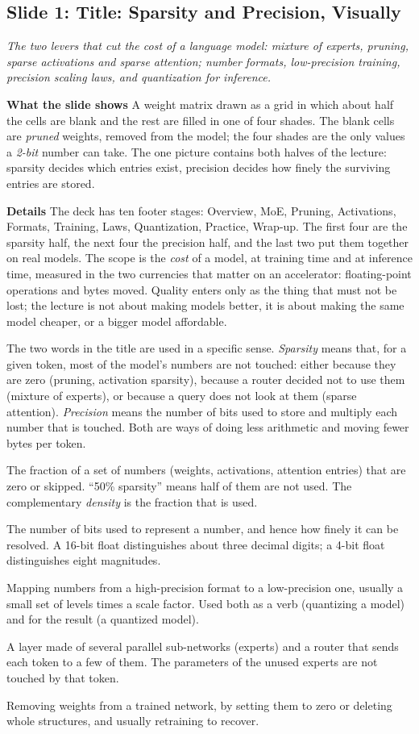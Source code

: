 \documentclass[11pt,letterpaper]{article}
\newcommand{\slide}[3]{%
  \subsection[Slide #1: #2]{Slide #1: #2}%
  {\color{muted}\itshape #3\par}\medskip}
\newcommand{\para}[1]{\medskip\noindent\textbf{#1}\quad}
\newenvironment{terms}{\begin{tcolorbox}[termsbox]\begin{description}[leftmargin=1.1em,itemsep=3pt,topsep=2pt,font=\normalfont]}{\end{description}\end{tcolorbox}}
\newcommand{\term}[2]{\item[\textbf{#1}]\index{#1} #2}
\begin{document}
\slide{1}{Title: Sparsity and Precision, Visually}{The two levers that cut the cost of a language model: mixture of experts, pruning, sparse activations and sparse attention; number formats, low-precision training, precision scaling laws, and quantization for inference.}

\para{What the slide shows} A weight matrix drawn as a grid in which about half the cells are blank and the rest are filled in one of four shades. The blank cells are \emph{pruned} weights, removed from the model; the four shades are the only values a \emph{2-bit} number can take. The one picture contains both halves of the lecture: sparsity decides which entries exist, precision decides how finely the surviving entries are stored.

\para{Details} The deck has ten footer stages: Overview, MoE, Pruning, Activations, Formats, Training, Laws, Quantization, Practice, Wrap-up. The first four are the sparsity half, the next four the precision half, and the last two put them together on real models. The scope is the \emph{cost} of a model, at training time and at inference time, measured in the two currencies that matter on an accelerator: floating-point operations and bytes moved. Quality enters only as the thing that must not be lost; the lecture is not about making models better, it is about making the same model cheaper, or a bigger model affordable.

The two words in the title are used in a specific sense. \emph{Sparsity} means that, for a given token, most of the model's numbers are not touched: either because they are zero (pruning, activation sparsity), because a router decided not to use them (mixture of experts), or because a query does not look at them (sparse attention). \emph{Precision} means the number of bits used to store and multiply each number that is touched. Both are ways of doing less arithmetic and moving fewer bytes per token.

\begin{terms}
\term{sparsity}{The fraction of a set of numbers (weights, activations, attention entries) that are zero or skipped. ``50\% sparsity'' means half of them are not used. The complementary \emph{density} is the fraction that is used.}
\term{precision}{The number of bits used to represent a number, and hence how finely it can be resolved. A 16-bit float distinguishes about three decimal digits; a 4-bit float distinguishes eight magnitudes.}
\term{quantization}{Mapping numbers from a high-precision format to a low-precision one, usually a small set of levels times a scale factor. Used both as a verb (quantizing a model) and for the result (a quantized model).}
\term{mixture of experts (MoE)}{A layer made of several parallel sub-networks (experts) and a router that sends each token to a few of them. The parameters of the unused experts are not touched by that token.}
\term{pruning}{Removing weights from a trained network, by setting them to zero or deleting whole structures, and usually retraining to recover.}
\end{terms}
\end{document}
